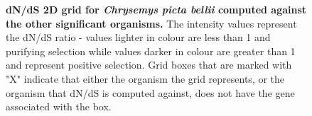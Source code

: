 \documentclass{article}
\begin{document}
\begin{figure}[H]
\centering
{}
\caption{\textbf{dN/dS 2D grid for \textit{Chrysemys picta bellii} computed against the other significant organisms.} The intensity values represent the dN/dS ratio - values lighter in colour are less than 1 and purifying selection while values darker in colour are greater than 1 and represent positive selection. Grid boxes that are marked with "X" indicate that either the organism the grid represents, or the organism that dN/dS is computed against, does not have the gene associated with the box.}
\label{sup_fig_20}
\end{figure}
\end{document}
